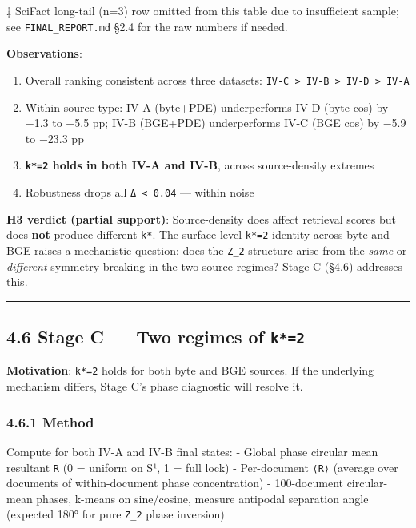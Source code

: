 \documentclass[
]{article}
\providecommand{\tightlist}{%
  \setlength{\itemsep}{0pt}\setlength{\parskip}{0pt}}
\begin{document}
‡ SciFact long-tail (n=3) row omitted from this table due to
insufficient sample; see \texttt{FINAL\_REPORT.md} §2.4 for the raw
numbers if needed.

\textbf{Observations}:

\begin{enumerate}
\def\labelenumi{\arabic{enumi}.}
\tightlist
\item
  Overall ranking consistent across three datasets:
  \texttt{IV-C\ \textgreater{}\ IV-B\ \textgreater{}\ IV-D\ \textgreater{}\ IV-A}
\item
  Within-source-type: IV-A (byte+PDE) underperforms IV-D (byte cos) by
  −1.3 to −5.5 pp; IV-B (BGE+PDE) underperforms IV-C (BGE cos) by −5.9
  to −23.3 pp
\item
  \textbf{\texttt{k*=2} holds in both IV-A and IV-B}, across
  source-density extremes
\item
  Robustness drops all \texttt{\textbar{}Δ\textbar{}\ \textless{}\ 0.04}
  --- within noise
\end{enumerate}

\textbf{H3 verdict (partial support)}: Source-density does affect
retrieval scores but does \textbf{not} produce different \texttt{k*}.
The surface-level \texttt{k*=2} identity across byte and BGE raises a
mechanistic question: does the \texttt{Z\_2} structure arise from the
\emph{same} or \emph{different} symmetry breaking in the two source
regimes? Stage C (§4.6) addresses this.

\begin{center}\rule{0.5\linewidth}{0.5pt}\end{center}

\hypertarget{stage-c-two-regimes-of-k2}{%
\subsection{\texorpdfstring{4.6 Stage C --- Two regimes of
\texttt{k*=2}}{4.6 Stage C --- Two regimes of k*=2}}\label{stage-c-two-regimes-of-k2}}

\textbf{Motivation}: \texttt{k*=2} holds for both byte and BGE sources.
If the underlying mechanism differs, Stage C's phase diagnostic will
resolve it.

\hypertarget{method}{%
\subsubsection{4.6.1 Method}\label{method}}

Compute for both IV-A and IV-B final states: - Global phase circular
mean resultant \texttt{\textbar{}R\textbar{}} (0 = uniform on S¹, 1 =
full lock) - Per-document \texttt{⟨\textbar{}R\textbar{}⟩} (average over
documents of within-document phase concentration) - 100-document
circular-mean phases, k-means on sine/cosine, measure antipodal
separation angle (expected 180° for pure \texttt{Z\_2} phase inversion)
\end{document}
